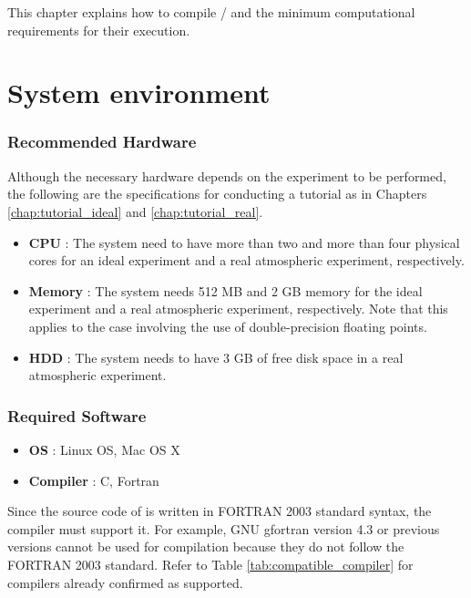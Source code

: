 This chapter explains how to compile \scalelib / \scalerm
and the minimum computational requirements for their execution.

\section{System environment} \label{sec:req_env}
\subsubsection{Recommended Hardware}

  Although the necessary hardware depends on the experiment to be performed,
the following are the specifications for conducting a tutorial as in Chapters \ref{chap:tutorial_ideal} and \ref{chap:tutorial_real}.

  \begin{itemize}
    \item {\bf CPU} :
    The system need to have more than two and more than four physical cores
    for an ideal experiment and a real atmospheric experiment, respectively.
    \item {\bf Memory} :
    The system needs 512 MB and 2 GB memory
    for the ideal experiment and a real atmospheric experiment, respectively.
    Note that this applies to the case involving the use of double-precision floating points.
    \item {\bf HDD} : The system needs to have 3 GB of free disk space in a real atmospheric experiment.
  \end{itemize}


\subsubsection{Required Software}

  \begin{itemize}
  \item {\bf OS} : Linux OS, Mac OS X
  \item {\bf Compiler} : C, Fortran
  \end{itemize}

Since the source code of \scalelib is  written in FORTRAN 2003 standard syntax, the compiler must support it. For example, GNU gfortran version 4.3 or previous versions cannot be used for \scalelib compilation because they do not follow the FORTRAN 2003 standard. Refer to Table \ref{tab:compatible_compiler} for compilers already confirmed as supported.


